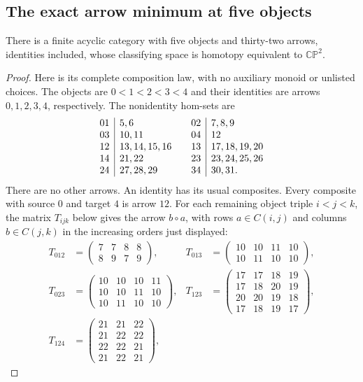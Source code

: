 \subsection{The exact arrow minimum at five objects}

\begin{theorem}[Proved]\label{A7:model32}
There is a finite acyclic category with five objects and thirty-two
arrows, identities included, whose classifying space is homotopy
equivalent to $\mathbb{CP}^2$.
\end{theorem}
\begin{proof}
Here is its complete composition law, with no auxiliary monoid or
unlisted choices. The objects are $0<1<2<3<4$ and their identities
are arrows $0,1,2,3,4$, respectively. The nonidentity hom-sets are
\[
\begin{array}{c|l@{\qquad}c|l}
01&5,6&02&7,8,9\\
03&10,11&04&12\\
12&13,14,15,16&13&17,18,19,20\\
14&21,22&23&23,24,25,26\\
24&27,28,29&34&30,31.
\end{array}
\]
There are no other arrows. An identity has its usual composites.
Every composite with source $0$ and target $4$ is arrow $12$.
For each remaining object triple $i<j<k$, the matrix $T_{ijk}$
below gives the arrow $b\circ a$, with rows $a\in C(i,j)$ and
columns $b\in C(j,k)$ in the increasing orders just displayed:
\[
\begin{aligned}
T_{012}&=\begin{pmatrix}7&7&8&8\\8&9&7&9\end{pmatrix},&
T_{013}&=\begin{pmatrix}10&10&11&10\\10&11&10&10\end{pmatrix},\\[3pt]
T_{023}&=\begin{pmatrix}10&10&10&11\\10&10&11&10\\10&11&10&10\end{pmatrix},&
T_{123}&=\begin{pmatrix}
17&17&18&19\\17&18&20&19\\20&20&19&18\\17&18&19&17
\end{pmatrix},\\[3pt]
T_{124}&=\begin{pmatrix}21&21&22\\21&22&22\\22&22&21\\21&22&21\end{pmatrix},&

\end{aligned}\]
\end{proof}
